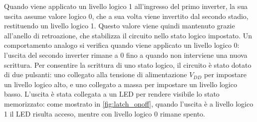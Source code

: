 \documentclass[a4paper,12pt]{article}
\begin{document}
Quando viene applicato un livello logico 1 all’ingresso del primo inverter, la sua uscita assume valore logico 0, che a sua volta viene invertito dal secondo stadio, restituendo un livello logico 1.
Questo valore viene quindi mantenuto grazie all’anello di retroazione, che stabilizza il circuito nello stato logico impostato.
Un comportamento analogo si verifica quando viene applicato un livello logico 0: l’uscita del secondo inverter rimane a 0 fino a quando non interviene una nuova scrittura.
Per consentire la scrittura di uno stato logico, il circuito è stato dotato di due pulsanti:
uno collegato alla tensione di alimentazione $V_{DD}$ per impostare un livello logico alto, e uno collegato a massa per impostare un livello logico basso.
L’uscita è stata collegata a un LED per rendere visibile lo stato memorizzato: come mostrato in \autoref{fig:latch_onoff}, quando l’uscita è a livello logico 1 il LED risulta acceso, mentre con livello logico 0 rimane spento.
\end{document}
